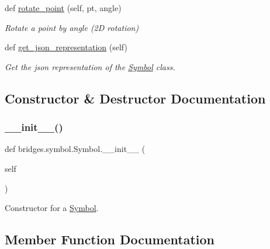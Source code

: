 \begin{DoxyCompactItemize}
def \hyperlink{classbridges_1_1symbol_1_1_symbol_a81d55230ba4fec6c9a31d76cfc97bc96}{rotate\+\_\+point} (self, pt, angle)
\begin{DoxyCompactList}\small\item\em Rotate a point by \textquotesingle{}angle\textquotesingle{} (2D rotation) \end{DoxyCompactList}\item 
def \hyperlink{classbridges_1_1symbol_1_1_symbol_a746f8e6d1fd1c63c8a9140a2af7436f8}{get\+\_\+json\+\_\+representation} (self)
\begin{DoxyCompactList}\small\item\em Get the json representation of the \hyperlink{classbridges_1_1symbol_1_1_symbol}{Symbol} class. \end{DoxyCompactList}\end{DoxyCompactItemize}


\subsection{Constructor \& Destructor Documentation}
\mbox{\label{classbridges_1_1symbol_1_1_symbol_a57c7fcd41baccb9c2e15c9c828d957f6}} 
\subsubsection{\texorpdfstring{\+\_\+\+\_\+init\+\_\+\+\_\+()}{\_\_init\_\_()}}
{\footnotesize\ttfamily def bridges.\+symbol.\+Symbol.\+\_\+\+\_\+init\+\_\+\+\_\+ (\begin{DoxyParamCaption}\item[{}]{self }\end{DoxyParamCaption})}



Constructor for a \hyperlink{classbridges_1_1symbol_1_1_symbol}{Symbol}. 



\subsection{Member Function Documentation}
\mbox{\label{classbridges_1_1symbol_1_1_symbol_a1a5e9147e426fb7ec74fe60a5cdc9ded}} 
